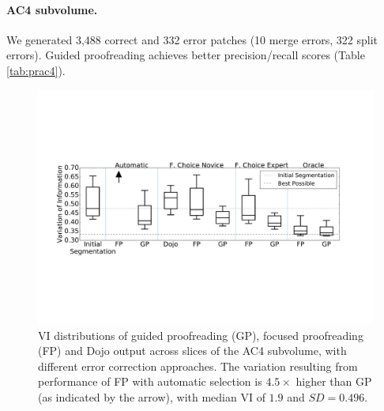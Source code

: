 \paragraph{AC4 subvolume.} We generated 3,488 correct and 332 error patches (10 merge errors, 322 split errors). Guided proofreading achieves better precision/recall scores (Table \ref{tab:prac4}).

\begin{table}[t]
\caption{Classifier comparison on correct and split error patches of the AC4 subvolume.}%
\label{tab:prac4}
\end{table}

\begin{figure}[t]
\centering
\includegraphics[width=\linewidth]{gfx/ac4boxplot.pdf}
\caption{VI distributions of guided proofreading (GP), focused proofreading (FP) and Dojo output across slices of the AC4 subvolume, with different error correction approaches. The variation resulting from performance of FP with automatic selection is $4.5\times$ higher than GP (as indicated by the arrow), with median VI of $1.9$ and $SD=0.496$.}
\label{fig:ac4boxplot}
\end{figure}

